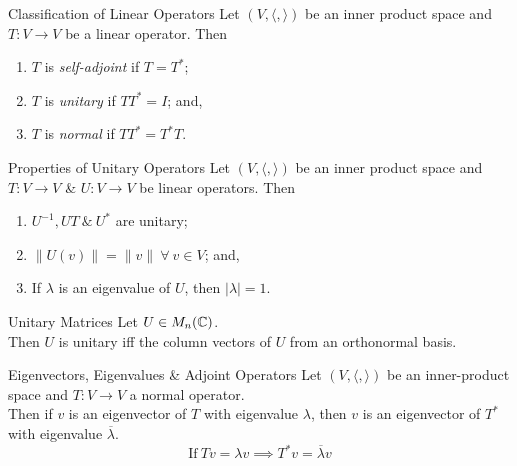 \documentclass[11pt,a4paper]{article}
\begin{document}
\subtitle{Definition 10.08 - }{Classification of Linear Operators}
Let $(V, \langle,\rangle)$ be an inner product space and $T : V \to V$ be a linear operator. Then
\begin{enumerate}[label=\roman*)]
  \item $T$ is \textit{self-adjoint} if $T = T^*$;
  \item $T$ is \textit{unitary} if $TT^* = I$; and,
  \item $T$ is \textit{normal} if $TT^* = T^*T$.
\end{enumerate}

\subtitle{Theorem 10.09 - }{Properties of Unitary Operators}
Let $(V, \langle,\rangle)$ be an inner product space and $T : V \to V$ \& $U : V \to V$ be linear operators. Then
\begin{enumerate}[label=\roman*)]
  \item $U^{-1}, UT\ \&\ U^*$ are unitary;
  \item $\|U(v)\| = \|v\|\ \forall\ v \in V$; and,
  \item If $\lambda$ is an eigenvalue of $U$, then $|\lambda| = 1$.
\end{enumerate}

\subtitle{Theorem 10.10 - }{Unitary Matrices}
Let $U \in M_n(\mathbb{C})$.\\
Then $U$ is unitary iff the column vectors of $U$ from an orthonormal basis.\\

\subtitle{Theorem 10.11 - }{Eigenvectors, Eigenvalues \& Adjoint Operators}
Let $(V, \langle,\rangle)$ be an inner-product space and $T : V \to V$ a normal operator.\\
Then if $v$ is an eigenvector of $T$ with eigenvalue $\lambda$, then $v$ is an eigenvector of $T^*$ with eigenvalue $\overline{\lambda}$.
$$\mathrm{If\ }Tv = \lambda v \implies T^*v = \overline{\lambda}v$$

\end{document}
